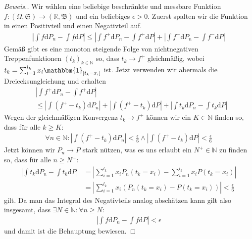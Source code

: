 \begin{proof}[Beweis.]
    Wir wählen eine beliebige beschränkte und messbare Funktion $f:(\Omega,\mathfrak{S})\to(\mathbb{R},\mathfrak{B})$ und ein beliebiges $\epsilon>0$. Zuerst spalten wir die Funktion in einen Positivteil und einen Negativteil auf.
    \begin{align*}
        \left\vert\int f\mathrm{d}P_n-\int f\mathrm{d}P\right\vert\leq\left\vert\int f^+\mathrm{d}P_n-\int f^+\mathrm{d}P\right\vert+\left\vert\int f^-\mathrm{d}P_n-\int f^-\mathrm{d}P\right\vert
    \end{align*}
    Gemäß gibt es eine monoton steigende Folge von nichtnegativen Treppenfunktionen $(t_k)_{k\in\mathbb{N}}$ so, dass $t_k\to f^+$ gleichmäßig, wobei $t_k=\sum_{i=1}^{l_k}x_i\mathbbm{1}_{[t_k=x_i]}$ ist. Jetzt verwenden wir abermals die Dreiecksungleichung und erhalten
    \begin{align*}
        &\left\vert\int f^+\mathrm{d}P_n-\int f^+\mathrm{d}P\right\vert\\
        &\leq\left\vert\int\left(f^+-t_k\right)\mathrm{d}P_n\right\vert+\left\vert\int\left(f^+-t_k\right)\mathrm{d}P\right\vert+\left\vert\int t_k\mathrm{d}P_n-\int t_k\mathrm{d}P\right\vert
    \end{align*}
    Wegen der gleichmäßigen Konvergenz $t_k\to f^+$ können wir ein $K\in\mathbb{N}$ finden so, dass für alle $k\geq K:$
    \begin{align*}
        \forall n\in\mathbb{N}:\left\vert\int\left(f^+-t_k\right)\mathrm{d}P_n\right\vert<\frac{\epsilon}{6}\land\left\vert\int\left(f^+-t_k\right)\mathrm{d}P\right\vert<\frac{\epsilon}{6}
    \end{align*}
    Jetzt können wir $P_n\to P$ stark nützen, was es uns erlaubt ein $N^+\in\mathbb{N}$ zu finden so, dass für alle $n\geq N^+$:
    \begin{align*}
        \left\vert\int t_k\mathrm{d}P_n-\int t_k\mathrm{d}P\right\vert&=\left\vert\sum_{i=1}^{l_k}x_iP_n(t_k=x_i)-\sum_{i=1}^{l_k} x_iP(t_k=x_i)\right\vert\\
        &=\left\vert\sum_{i=1}^{l_k}x_i\left(P_n(t_k=x_i)-P(t_k=x_i)\right)\right\vert<\frac{\epsilon}{6}
    \end{align*}
    gilt. Da man das Integral des Negativteils analog abschätzen kann gilt also insgesamt, dass $\exists N\in\mathbb{N}:\forall n\geq N:$
    \begin{align*}
        \left\vert\int f\mathrm{d}P_n-\int f\mathrm{d}P\right\vert<\epsilon
    \end{align*}
    und damit ist die Behauptung bewiesen.
\end{proof}
